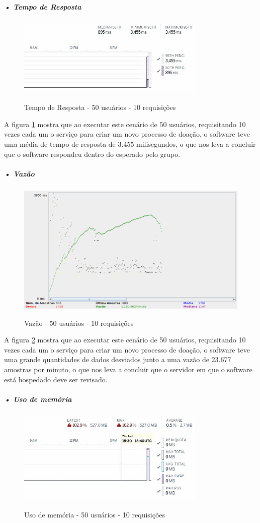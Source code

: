 \documentclass[portuguese,oneside]{tcc}
\begin{document}
\subparagraph{• Tempo de Resposta}
\begin{figure}[htp]
\centering
\caption{Tempo de Resposta - 50 usuários - 10 requisições}
\includegraphics[width=9cm]{50-10-response-time}
\label{fig:tempo-reposta-50-10}
\end{figure}
A figura \ref{fig:tempo-reposta-50-10} mostra que ao executar este cenário de 50 usuários, requisitando 10 vezes cada um o serviço para criar um novo processo de doação, o software teve uma média de tempo de resposta de 3.455 milisegundos, o que nos leva a concluir que o software respondeu dentro do esperado pelo grupo.

\subparagraph{• Vazão}
\begin{figure}[htp]
\centering
\caption{Vazão - 50 usuários - 10 requisições}
\includegraphics[width=15cm]{50-10-throughput}
\label{fig:throughput-50-10}
\end{figure}

A figura \ref{fig:throughput-50-10} mostra que ao executar este cenário de 50 usuários, requisitando 10 vezes cada um o serviço para criar um novo processo de doação, o software teve uma grande quantidades de dados desviados junto a uma vazão de 23.677 amostras por minuto, o que nos leva a concluir que o servidor em que o software está hospedado deve ser revisado.

\subparagraph{• Uso de memória}
\begin{figure}[htp]
\centering
\caption{Uso de memória - 50 usuários - 10 requisições}
\includegraphics[width=9cm]{50-10-memory}
\label{fig:uso-de-memoria-50-10}
\end{figure}
\end{document}
